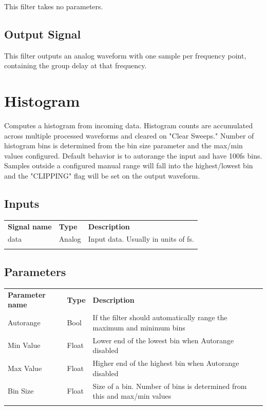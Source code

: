 This filter takes no parameters.

\subsection{Output Signal}

This filter outputs an analog waveform with one sample per frequency point, containing the group delay at that
frequency.

\pagebreak
\section{Histogram}
\label{filter:histogram}

Computes a histogram from incoming data. Histogram counts are accumulated across multiple processed waveforms and cleared
on "Clear Sweeps." Number of histogram bins is determined from the bin size parameter and the max/min values configured.
Default behavior is to autorange the input and have 100fs bins. Samples outside a configured manual range will fall into
the highest/lowest bin and the "CLIPPING" flag will be set on the output waveform.

\subsection{Inputs}

\begin{tabularx}{16cm}{llX}
\thickhline
\textbf{Signal name} & \textbf{Type} & \textbf{Description} \\
\thickhline
data & Analog & Input data. Usually in units of fs.\\
\thickhline
\end{tabularx}

\subsection{Parameters}

\begin{tabularx}{16cm}{llX}
\thickhline
\textbf{Parameter name} & \textbf{Type} & \textbf{Description} \\
\thickhline
Autorange & Bool & If the filter should automatically range the maximum and minimum bins\\
\thinhline
Min Value & Float & Lower end of the lowest bin when Autorange disabled\\
\thinhline
Max Value & Float & Higher end of the highest bin when Autorange disabled\\
\thinhline
Bin Size & Float & Size of a bin. Number of bins is determined from this and max/min values\\
\thickhline
\end{tabularx}

